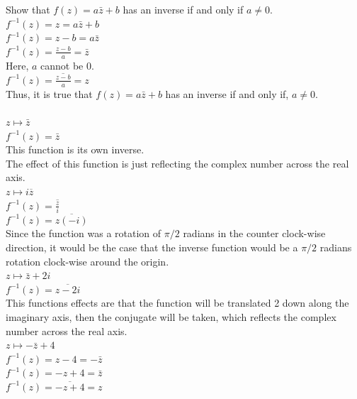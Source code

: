 \documentclass[12pt]{article}
\begin{document}
 Show that $f(z) = a\bar{z} + b$ has an inverse if and only if $a \neq 0$.\\
$f^{-1}(z) = z = a\bar{z} + b$\\
$f^{-1}(z) = z - b = a\bar{z}$\\
$f^{-1}(z) = \frac{z - b}{a} = \bar{z}$\\
Here, $a$ cannot be $0$.\\
$f^{-1}(z) = \overline{\frac{z - b}{a}} = z$\\

Thus, it is true that $f(z) = a\bar{z} + b$ has an inverse if and only if, $a \neq 0$.\\


\\

 $z \mapsto \bar{z}$\\
$f^{-1}(z) = \bar{z}$\\
This function is its own inverse.\\

The effect of this function is just reflecting the complex number across the real axis.\\


 $z \mapsto i\overline{z}$\\
$f^{-1}(z) = \overline{\frac{z}{i}}$\\
$f^{-1}(z) = \overline{z(-i)}$\\

Since the function was a rotation of $\pi/2$ radians in the counter clock-wise direction, it would be the case that the inverse function would be a $\pi/2$ radians rotation clock-wise around the origin.\\ 


 $z \mapsto \bar{z} + 2i$\\
$f^{-1}(z) = \overline{z - 2i}$\\

This functions effects are that the function will be translated 2 down along the imaginary axis, then the conjugate will be taken, which reflects the complex number across the real axis.\\

 $z \mapsto -\bar{z} + 4$\\
$f^{-1}(z) = z - 4 = -\bar{z}$\\
$f^{-1}(z) = -z + 4 = \bar{z}$\\
$f^{-1}(z) = \overline{-z + 4} = z$\\
\end{document}
